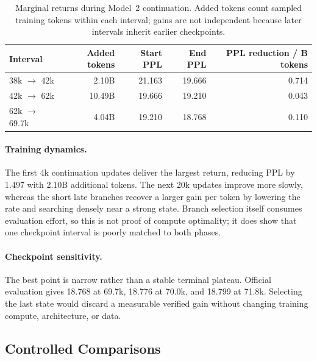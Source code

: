 \documentclass{article}
\begin{document}
\begin{table}[H]
  \caption{Marginal returns during Model~2 continuation. Added tokens count
  sampled training tokens within each interval; gains are not independent
  because later intervals inherit earlier checkpoints.}
  \label{tab:marginal-returns}
  \centering
  \small
  \setlength{\tabcolsep}{7pt}
  \begin{tabular}{@{}lrrrr@{}}
    \toprule
    Interval & Added tokens & Start PPL & End PPL & PPL reduction / B tokens \\
    \midrule
    38k $\rightarrow$ 42k & 2.10B & 21.163 & 19.666 & 0.714 \\
    42k $\rightarrow$ 62k & 10.49B & 19.666 & 19.210 & 0.043 \\
    62k $\rightarrow$ 69.7k & 4.04B & 19.210 & 18.768 & 0.110 \\
    \bottomrule
  \end{tabular}
\end{table}

\paragraph{Training dynamics.}
The first 4k continuation updates deliver the largest return, reducing PPL by
1.497 with 2.10B additional tokens. The next 20k updates improve more slowly,
whereas the short late branches recover a larger gain per token by lowering
the rate and searching densely near a strong state. Branch selection itself
consumes evaluation effort, so this is not proof of compute optimality; it
does show that one checkpoint interval is poorly matched to both phases.

\paragraph{Checkpoint sensitivity.}
The best point is narrow rather than a stable terminal plateau. Official
evaluation gives 18.768 at 69.7k, 18.776 at 70.0k, and 18.799 at 71.8k.
Selecting the last state would discard a measurable verified gain without
changing training compute, architecture, or data.

\subsection{Controlled Comparisons}
\label{sec:ablations}
\end{document}
